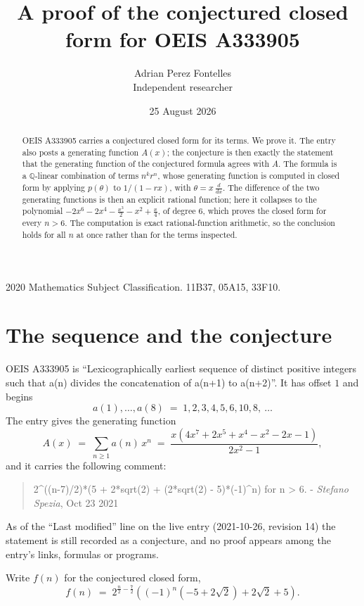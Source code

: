 \documentclass[11pt,a4paper]{article}
\title{A proof of the conjectured closed form for OEIS A333905}
\author{Adrian Perez Fontelles\\ \small Independent researcher}
\date{25 August 2026}
\theoremstyle{plain}
\theoremstyle{definition}
\begin{document}
\maketitle

\begin{abstract}
OEIS A333905 carries a conjectured closed form for its terms. We prove it. The entry
also posts a generating function $A(x)$; the conjecture is then exactly the statement
that the generating function of the conjectured formula agrees with $A$. The formula is
a $\mathbb{Q}$-linear combination of terms $n^{k}r^{n}$, whose generating function is
computed in closed form by applying $p(\theta)$ to $1/(1-rx)$, with
$\theta=x\,\frac{d}{dx}$. The difference of the two generating functions is then an
explicit rational function; here it collapses to the polynomial $- 2 x^{6} - 2 x^{4} - \frac{x^{3}}{2} - x^{2} + \frac{x}{4}$, of degree
$6$, which proves the closed form for every $n>6$. The computation is exact
rational-function arithmetic, so the conclusion holds for all $n$ at once rather than
for the terms inspected.
\end{abstract}

\noindent\small 2020 Mathematics Subject Classification. 11B37, 05A15, 33F10.\normalsize

\section{The sequence and the conjecture}

OEIS A333905 is ``Lexicographically earliest sequence of distinct positive integers such that a(n) divides the concatenation of a(n+1) to a(n+2)''. It has offset $1$ and begins
\[
a(1),\dots,a(8)\;=\;1, 2, 3, 4, 5, 6, 10, 8,\ \dots
\]
The entry gives the generating function
\begin{equation}\label{eq:gf}
A(x)\;=\;\sum_{n\ge 1} a(n)\,x^{n}\;=\;\frac{x \left(4 x^{7} + 2 x^{5} + x^{4} - x^{2} - 2 x - 1\right)}{2 x^{2} - 1} ,
\end{equation}
and it carries the following comment:
\begin{quote}\small
2\^{}((n-7)/2)*(5 + 2*sqrt(2) + (2*sqrt(2) - 5)*(-1)\^{}n) for n > 6. - \emph{Stefano Spezia}, Oct 23 2021
\end{quote}
As of the ``Last modified'' line on the live entry (2021-10-26, revision 14) the
statement is still recorded as a conjecture, and no proof appears among the entry's links,
formulas or programs.

Write $f(n)$ for the conjectured closed form,
\[
f(n)\;=\;2^{\frac{n}{2} - \frac{7}{2}} \left(\left(-1\right)^{n} \left(-5 + 2 \sqrt{2}\right) + 2 \sqrt{2} + 5\right) .
\]
\end{document}
